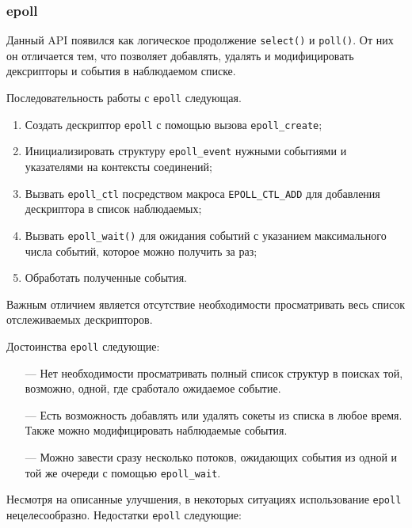 \subsubsection{epoll}

Данный API появился как логическое продолжение \texttt{select()} и \texttt{poll()}. От них он отличается тем, что позволяет добавлять, удалять и модифицировать дексрипторы и события в наблюдаемом списке.

Последовательность работы с \texttt{epoll} следующая.

\begin{enumerate}
	\item Создать дескриптор \texttt{epoll} с помощью вызова \texttt{epoll\_create};
	
	\item Инициализировать структуру \texttt{epoll\_event} нужными событиями и указателями на контексты соединений;
	
	\item Вызвать \texttt{epoll\_ctl} посредством макроса \texttt{EPOLL\_CTL\_ADD} для добавления дескриптора в список наблюдаемых;
	
	\item Вызвать \texttt{epoll\_wait()} для ожидания событий с указанием максимального числа событий, которое можно получить за раз;
	
	\item Обработать полученные события.
\end{enumerate}

Важным отличием является отсутствие необходимости просматривать весь список отслеживаемых дескрипторов.

Достоинства \texttt{epoll} следующие:
\begin{itemize}
	\item[---] Нет необходимости просматривать полный список структур в поисках той, возможно, одной, где сработало ожидаемое событие.
	
	\item[---] Есть возможность добавлять или удалять сокеты из списка в любое время. Также можно модифицировать наблюдаемые события.
	
	\item[---] Можно завести сразу несколько потоков, ожидающих события из одной и той же очереди с помощью \texttt{epoll\_wait}.
\end{itemize}

Несмотря на описанные улучшения, в некоторых ситуациях использование \texttt{epoll} нецелесообразно. Недостатки \texttt{epoll} следующие:


